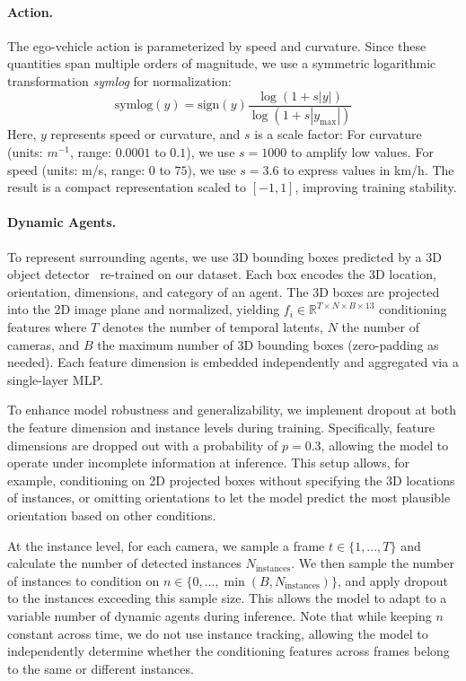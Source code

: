 \paragraph{Action.} The ego-vehicle action is parameterized by speed and curvature. Since these quantities span multiple orders of magnitude, we use a symmetric logarithmic transformation \textit{symlog} \cite{webber12} for normalization:
% 
\begin{equation}
    \text{symlog}(y) = \text{sign}(y)
    \frac{\log(1 + s|y|)}{\log(1 + s|y_{\text{max}}|)}
\end{equation}
% 
Here, $y$ represents speed or curvature, and $s$ is a scale factor:
For curvature (units: $m^{-1}$, range: $0.0001$ to $0.1$), we use $s = 1000$ to amplify low values. For speed (units: m/s, range: $0$ to $75$), we use $s = 3.6$ to express values in km/h.
The result is a compact representation scaled to $[-1, 1]$, improving training stability.

\paragraph{Dynamic Agents.}
To represent surrounding agents, we use 3D bounding boxes predicted by a 3D object detector~\cite{wang2023streampetr} re-trained on our dataset. Each box encodes the 3D location, orientation, dimensions, and category of an agent. The 3D boxes are projected into the 2D image plane and normalized, yielding $f_i \in \mathbb{R}^{T \times N \times B \times 13}$ conditioning features where $T$ denotes the number of temporal latents, $N$ the number of cameras, and $B$ the maximum number of 3D bounding boxes (zero-padding as needed). Each feature dimension is embedded independently and aggregated via a single-layer MLP.

To enhance model robustness and generalizability, we implement dropout at both the feature dimension and instance levels during training. Specifically, feature dimensions are dropped out with a probability of $p = 0.3$, allowing the model to operate under incomplete information at inference. This setup allows, for example, conditioning on 2D projected boxes without specifying the 3D locations of instances, or omitting orientations to let the model predict the most plausible orientation based on other conditions.

 At the instance level, for each camera, we sample a frame $t \in \{1, ..., T\}$ and calculate the number of detected instances $N_{\text{instances}}$. We then sample the number of instances to condition on $n\in \{0, ..., \min(B, N_{\text{instances}})\}$, and apply dropout to the instances exceeding this sample size. This allows the model to adapt to a variable number of dynamic agents during inference. Note that while keeping $n$ constant across time, we do not use instance tracking, allowing the model to independently determine whether the conditioning features across frames belong to the same or different instances.


